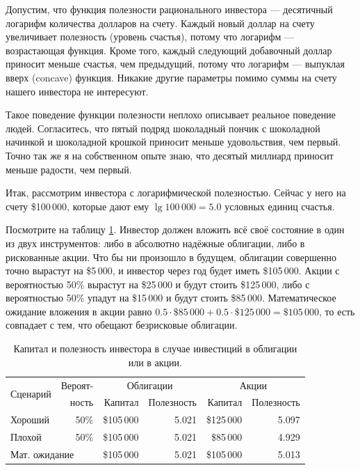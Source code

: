 Допустим, что функция полезности рационального инвестора --- десятичный логарифм
количества долларов на счету. Каждый новый доллар на счету увеличивает
полезность (уровень счастья), потому что логарифм --- возрастающая функция.
Кроме того, каждый следующий добавочный доллар приносит меньше счастья, чем
предыдущий, потому что логарифм --- выпуклая вверх (concave) функция. Никакие
другие параметры помимо суммы на счету нашего инвестора не интересуют.
 
Такое поведение функции полезности неплохо описывает реальное поведение людей. 
Согласитесь, что пятый подряд шоколадный пончик с шоколадной начинкой и 
шоколадной крошкой приносит меньше удовольствия, чем первый. Точно так же я на 
собственном опыте знаю, что десятый миллиард приносит меньше радости, чем 
первый.
 
Итак, рассмотрим инвестора с логарифмической полезностью. Сейчас у него на счету 
\$100\,000, которые дают ему $\lg 100\,000 = 5.0$ условных единиц счастья.
 
Посмотрите на таблицу \ref{logarithmic_utility_table}. Инвестор должен вложить 
всё своё состояние в один из двух инструментов: либо в абсолютно надёжные 
облигации, либо в рискованные акции. Что бы ни произошло в будущем, облигации 
совершенно точно вырастут на \$5\,000, и инвестор через год будет иметь
\$105\,000. Акции с вероятностью 50\% вырастут на \$25\,000 и будут стоить 
\$125\,000, либо с вероятностью 50\% упадут на \$15\,000 и будут стоить
\$85\,000. Математическое ожидание вложения в акции равно 
$0.5 \cdot \$85\,000 + 0.5 \cdot \$125\,000 = \$105\,000$, то есть совпадает с
тем, что обещают безрисковые облигации.

\begin{table}[h]
\centering
\begin{tabular}{l|r|r|r|r|r}
\multirow{2}{*}{Сценарий} &
Вероят- &
\multicolumn{2}{c|}{Облигации} &
\multicolumn{2}{c}{Акции} \\
\cline{3-6}
        &  ность   & Капитал    & Полезность & Капитал      & Полезность \\ \hline
Хороший & 50\% & \$105\,000 & 5.021 & \$125\,000 & 5.097 \\
Плохой  & 50\% & \$105\,000 & 5.021 & \$85\,000  & 4.929 \\ \hline
\multicolumn{2}{l|}{Мат. ожидание}  & \$105\,000 & 5.021 & \$105\,000 & 5.013
\end{tabular}
    \caption{
        Капитал и полезность инвестора в случае инвестиций в облигации или в
        акции.
    }
    \label{logarithmic_utility_table}
\end{table}

